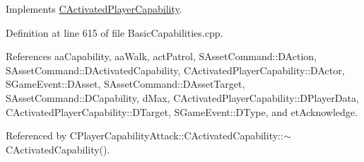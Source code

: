 Implements \hyperlink{classCActivatedPlayerCapability_a943b5999a57504399293250382c0ec6a}{C\+Activated\+Player\+Capability}.



Definition at line 615 of file Basic\+Capabilities.\+cpp.



References aa\+Capability, aa\+Walk, act\+Patrol, S\+Asset\+Command\+::\+D\+Action, S\+Asset\+Command\+::\+D\+Activated\+Capability, C\+Activated\+Player\+Capability\+::\+D\+Actor, S\+Game\+Event\+::\+D\+Asset, S\+Asset\+Command\+::\+D\+Asset\+Target, S\+Asset\+Command\+::\+D\+Capability, d\+Max, C\+Activated\+Player\+Capability\+::\+D\+Player\+Data, C\+Activated\+Player\+Capability\+::\+D\+Target, S\+Game\+Event\+::\+D\+Type, and et\+Acknowledge.



Referenced by C\+Player\+Capability\+Attack\+::\+C\+Activated\+Capability\+::$\sim$\+C\+Activated\+Capability().


